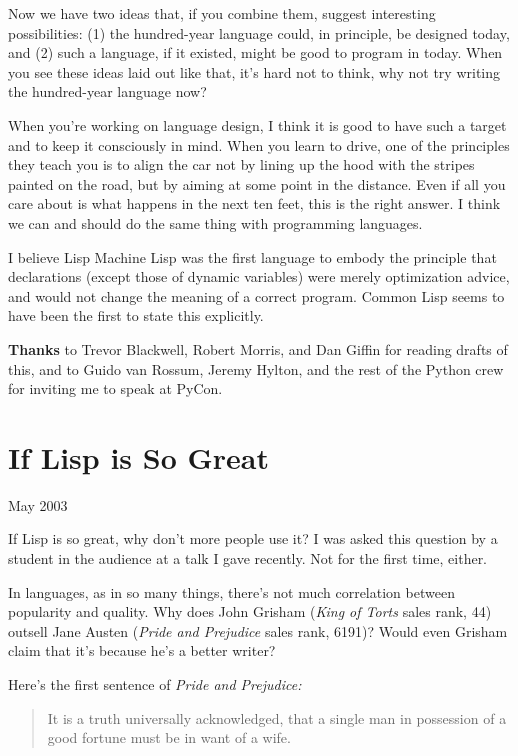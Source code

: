 \documentclass[12pt]{book}
\begin{document}
Now we have two ideas that, if you combine them, suggest interesting
possibilities: (1) the hundred-year language could, in principle, be
designed today, and (2) such a language, if it existed, might be good to
program in today. When you see these ideas laid out like that, it's hard
not to think, why not try writing the hundred-year language now?

When you're working on language design, I think it is good to have such
a target and to keep it consciously in mind. When you learn to drive,
one of the principles they teach you is to align the car not by lining
up the hood with the stripes painted on the road, but by aiming at some
point in the distance. Even if all you care about is what happens in the
next ten feet, this is the right answer. I think we can and should do
the same thing with programming languages.


I believe Lisp Machine Lisp was the first language to embody the
principle that declarations (except those of dynamic variables) were
merely optimization advice, and would not change the meaning of a
correct program. Common Lisp seems to have been the first to state this
explicitly.

\textbf{Thanks} to Trevor Blackwell, Robert Morris, and Dan Giffin for
reading drafts of this, and to Guido van Rossum, Jeremy Hylton, and the
rest of the Python crew for inviting me to speak at PyCon.
\chapter{If Lisp is So Great}

May 2003

If Lisp is so great, why don't more people use it? I was asked this
question by a student in the audience at a talk I gave recently. Not for
the first time, either.

In languages, as in so many things, there's not much correlation between
popularity and quality. Why does John Grisham (\emph{King of Torts}
sales rank, 44) outsell Jane Austen (\emph{Pride and Prejudice} sales
rank, 6191)? Would even Grisham claim that it's because he's a better
writer?

Here's the first sentence of \emph{Pride and Prejudice:}

\begin{quote}
It is a truth universally acknowledged, that a single man in possession
of a good fortune must be in want of a wife.
\end{quote}
\end{document}

